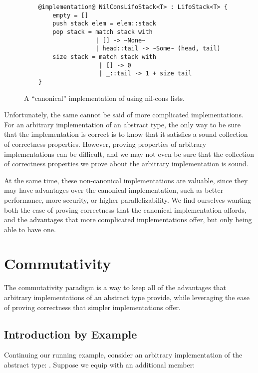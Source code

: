 \documentclass[12pt]{article}
\begin{document}
  \begin{figure}[H]
    \begin{lstlisting}
    @implementation@ NilConsLifoStack<T> : LifoStack<T> {
        empty = []
        push stack elem = elem::stack
        pop stack = match stack with
                    | [] -> ~None~
                    | head::tail -> ~Some~ (head, tail)
        size stack = match stack with
                     | [] -> 0
                     | _::tail -> 1 + size tail
    }
    \end{lstlisting}
    \caption{A ``canonical'' implementation of  using nil-cons lists.}
  \end{figure}

  \noindent  Unfortunately, the same cannot be said of more complicated implementations. For an arbitrary implementation of an abstract type, the only way to be sure that the implementation is correct is to know that it satisfies a sound collection of correctness properties. However, proving properties of arbitrary implementations can be difficult, and we may not even be sure that the collection of correctness properties we prove about the arbitrary implementation is sound.

  \bigskip

  \noindent At the same time, these non-canonical implementations are valuable, since they may have advantages over the canonical implementation, such as better performance, more security, or higher parallelizability. We find ourselves wanting both the ease of proving correctness that the canonical implementation affords, and the advantages that more complicated implementations offer, but only being able to have one.

\section{Commutativity}

  The commutativity paradigm is a way to keep all of the advantages that arbitrary implementations of an abstract type provide, while leveraging the ease of proving correctness that simpler implementations offer.

  \subsection{Introduction by Example}

  Continuing our running example, consider an arbitrary implementation of the  abstract type: . Suppose we equip  with an additional member:
\end{document}
